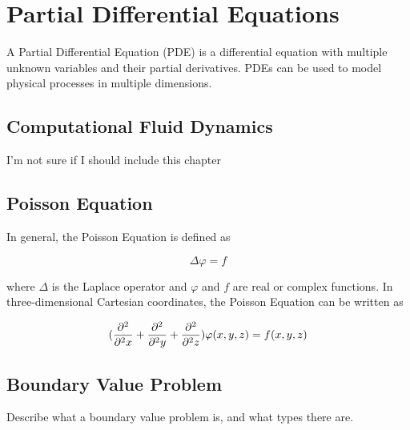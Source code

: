 \section*{Partial Differential Equations}

A Partial Differential Equation (PDE) is a differential equation with multiple 
unknown variables and their partial derivatives. PDEs can be used to model physical 
processes in multiple dimensions. 

\subsection*{Computational Fluid Dynamics}

I'm not sure if I should include this chapter

\subsection*{Poisson Equation}

In general, the Poisson Equation is defined as 

$$\Delta \varphi = f$$

where $\Delta$ is the Laplace operator and $\varphi$ and $f$ are real or complex 
functions. In three-dimensional Cartesian coordinates, the Poisson Equation can 
be written as 

$$(\frac{\partial^2}{\partial^2 x} + \frac{\partial^2}{\partial^2 y} + \frac{\partial^2}{\partial^2 z}) \varphi (x, y, z) = f(x, y, z)$$

\subsection*{Boundary Value Problem}

Describe what a boundary value problem is, and what types there are.

